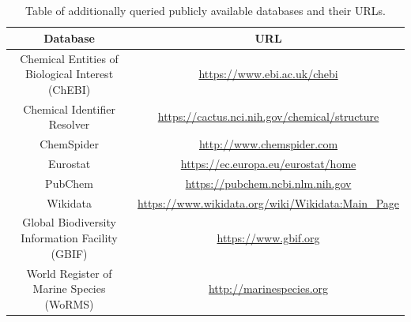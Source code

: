 \documentclass[journal,datadescriptor,accept,moreauthors,pdftex]{Definitions/mdpi}
\begin{document}
\section{}
\begin{table}[H]
    \caption{Table of additionally queried publicly available databases and their URLs.}
    \label{tab:data-base-additional}
    \centering
\begin{tabular}{cc}
    \toprule
    \textbf{Database} & \textbf{URL} \\ 
    \midrule
    \makecell{Chemical Entities of \\ Biological Interest (ChEBI)} & \url{https://www.ebi.ac.uk/chebi}  \\
    Chemical Identifier Resolver & \url{https://cactus.nci.nih.gov/chemical/structure} \\[0.5cm]
    ChemSpider & \url{http://www.chemspider.com}    \\[0.5cm]
    Eurostat & \url{https://ec.europa.eu/eurostat/home} \\[0.5cm]
    PubChem & \url{https://pubchem.ncbi.nlm.nih.gov} \\[0.5cm]
    Wikidata & \url{https://www.wikidata.org/wiki/Wikidata:Main_Page} \\[0.5cm]
    \makecell{Global Biodiversity \\ Information Facility (GBIF)} & \url{https://www.gbif.org} \\[0.5cm]
    \makecell{World Register of \\ Marine Species (WoRMS)} & \url{http://marinespecies.org} \\
    \bottomrule
\end{tabular}
\end{table}
\end{document}
